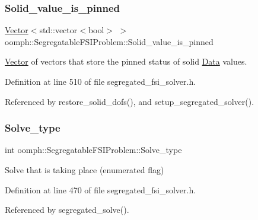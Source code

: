 \subsubsection{\texorpdfstring{Solid\+\_\+value\+\_\+is\+\_\+pinned}{Solid\_value\_is\_pinned}}
{\footnotesize\ttfamily \hyperlink{classoomph_1_1Vector}{Vector}$<$std\+::vector$<$bool$>$ $>$ oomph\+::\+Segregatable\+F\+S\+I\+Problem\+::\+Solid\+\_\+value\+\_\+is\+\_\+pinned\hspace{0.3cm}{\ttfamily [protected]}}



\hyperlink{classoomph_1_1Vector}{Vector} of vectors that store the pinned status of solid \hyperlink{classoomph_1_1Data}{Data} values. 



Definition at line 510 of file segregated\+\_\+fsi\+\_\+solver.\+h.



Referenced by restore\+\_\+solid\+\_\+dofs(), and setup\+\_\+segregated\+\_\+solver().

\mbox{\label{classoomph_1_1SegregatableFSIProblem_af238c6f11f6d4aacd2ff6e0dea917d40}} 
\subsubsection{\texorpdfstring{Solve\+\_\+type}{Solve\_type}}
{\footnotesize\ttfamily int oomph\+::\+Segregatable\+F\+S\+I\+Problem\+::\+Solve\+\_\+type\hspace{0.3cm}{\ttfamily [protected]}}



Solve that is taking place (enumerated flag) 



Definition at line 470 of file segregated\+\_\+fsi\+\_\+solver.\+h.



Referenced by segregated\+\_\+solve().

\mbox{\label{classoomph_1_1SegregatableFSIProblem_a814254917e5cedc6fce1793168124beb}} 
